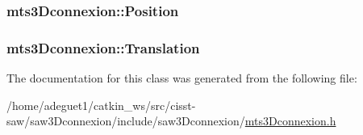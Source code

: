 \hypertarget{classmts3_dconnexion_a18477fb46941bead7c9c998aa4f64cae}{
\subsubsection[{Position}]{ mts3\-Dconnexion\-::\-Position\hspace{0.3cm}{\ttfamily [protected]}}}\label{classmts3_dconnexion_a18477fb46941bead7c9c998aa4f64cae}
\hypertarget{classmts3_dconnexion_a8e84db133cf3e6f2624b231a05e049bf}{
\subsubsection[{Translation}]{ mts3\-Dconnexion\-::\-Translation\hspace{0.3cm}{\ttfamily [protected]}}}\label{classmts3_dconnexion_a8e84db133cf3e6f2624b231a05e049bf}


The documentation for this class was generated from the following file\-:\begin{DoxyCompactItemize}
\item 
/home/adeguet1/catkin\-\_\-ws/src/cisst-\/saw/saw3\-Dconnexion/include/saw3\-Dconnexion/\hyperlink{mts3_dconnexion_8h}{mts3\-Dconnexion.\-h}\end{DoxyCompactItemize}
